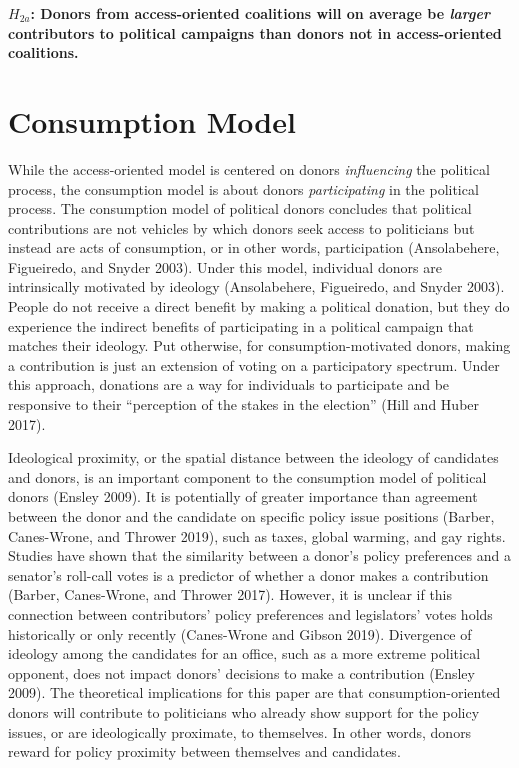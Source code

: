 \documentclass[12pt,]{article}
\begin{document}
\textbf{\(H_{2a}\): Donors from access-oriented coalitions will on
average be \emph{larger} contributors to political campaigns than donors
not in access-oriented coalitions.}

\hypertarget{consumption-model}{%
\section{Consumption Model}\label{consumption-model}}

While the access-oriented model is centered on donors \emph{influencing}
the political process, the consumption model is about donors
\emph{participating} in the political process. The consumption model of
political donors concludes that political contributions are not vehicles
by which donors seek access to politicians but instead are acts of
consumption, or in other words, participation (Ansolabehere, Figueiredo,
and Snyder 2003). Under this model, individual donors are intrinsically
motivated by ideology (Ansolabehere, Figueiredo, and Snyder 2003).
People do not receive a direct benefit by making a political donation,
but they do experience the indirect benefits of participating in a
political campaign that matches their ideology. Put otherwise, for
consumption-motivated donors, making a contribution is just an extension
of voting on a participatory spectrum. Under this approach, donations
are a way for individuals to participate and be responsive to their
``perception of the stakes in the election'' (Hill and Huber 2017).

Ideological proximity, or the spatial distance between the ideology of
candidates and donors, is an important component to the consumption
model of political donors (Ensley 2009). It is potentially of greater
importance than agreement between the donor and the candidate on
specific policy issue positions (Barber, Canes-Wrone, and Thrower 2019),
such as taxes, global warming, and gay rights. Studies have shown that
the similarity between a donor's policy preferences and a senator's
roll-call votes is a predictor of whether a donor makes a contribution
(Barber, Canes-Wrone, and Thrower 2017). However, it is unclear if this
connection between contributors' policy preferences and legislators'
votes holds historically or only recently (Canes-Wrone and Gibson 2019).
Divergence of ideology among the candidates for an office, such as a
more extreme political opponent, does not impact donors' decisions to
make a contribution (Ensley 2009). The theoretical implications for this
paper are that consumption-oriented donors will contribute to
politicians who already show support for the policy issues, or are
ideologically proximate, to themselves. In other words, donors reward
for policy proximity between themselves and candidates.
\end{document}
